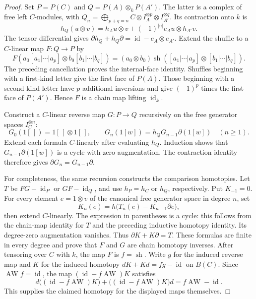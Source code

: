 \begin{proof}
Set $P=P(C)$ and $Q=P(A)\otimes_kP(A')$. The latter is a complex
of free left $C$-modules, with
$Q_n=\bigoplus_{p+q=n}C\otimes I_A^{\otimes p}\otimes I_{A'}^{\otimes q}$.
Its contraction onto $k$ is
\[
 h_Q(u\otimes v)=h_Au\otimes v+(-1)^{|u|}e_Au\otimes h_{A'}v.
\]
The tensor differential gives
$\partial h_Q+h_Q\partial=\operatorname{id}-e_A\otimes e_{A'}$.
Extend the shuffle to a $C$-linear map $F\colon Q\to P$ by
\[
 F(a_0[a_1|\cdots|a_p]\otimes b_0[b_1|\cdots|b_q])
 =(a_0\otimes b_0)\operatorname{sh}([a_1|\cdots|a_p]
                                      \otimes[b_1|\cdots|b_q]).
\]
The preceding cancellation proves the internal-face identity.
Shuffles beginning with a first-kind letter give the first face
of $P(A)$. Those beginning with a second-kind letter have $p$
additional inversions and give $(-1)^p$ times the first face of
$P(A')$. Hence $F$ is a chain map lifting $\operatorname{id}_k$.

Construct a $C$-linear reverse map $G\colon P\to Q$ recursively on
the free generator spaces $I_C^{\otimes n}$:
\[
 G_0(1[\,])=1[\,]\otimes1[\,],\qquad
 G_n(1[w])=h_QG_{n-1}\partial(1[w])\quad(n\geq1).
\]
Extend each formula $C$-linearly after evaluating $h_Q$.
Induction shows that $G_{n-1}\partial(1[w])$ is a cycle with zero
augmentation. The contraction identity therefore gives
$\partial G_n=G_{n-1}\partial$.

For completeness, the same recursion constructs the comparison
homotopies. Let $T$ be $FG-\operatorname{id}_P$ or
$GF-\operatorname{id}_Q$, and use $h_P=h_C$ or $h_Q$, respectively.
Put $K_{-1}=0$. For every element $e=1\otimes v$ of the canonical
free generator space in degree $n$, set
\[
 K_n(e)=h\bigl(T_n(e)-K_{n-1}\partial e\bigr),
\]
then extend $C$-linearly. The expression in parentheses is a cycle:
this follows from the chain-map identity for $T$ and the preceding
inductive homotopy identity. Its degree-zero augmentation vanishes.
Thus $\partial K+K\partial=T$. These formulas are finite in every
degree and prove that $F$ and $G$ are chain homotopy inverses.
After tensoring over $C$ with $k$, the map $F$ is
$f=\operatorname{sh}$. Write $g$ for the induced reverse map and
$K$ for the induced homotopy
$dK+Kd=fg-\operatorname{id}$ on $B(C)$.
Since $\operatorname{AW}f=\operatorname{id}$, the map
$(\operatorname{id}-f\operatorname{AW})K$ satisfies
\[
 d\bigl((\operatorname{id}-f\operatorname{AW})K\bigr)
 +\bigl((\operatorname{id}-f\operatorname{AW})K\bigr)d
 =f\operatorname{AW}-\operatorname{id}.
\]
This supplies the claimed homotopy for the displayed maps themselves.


\end{proof}
